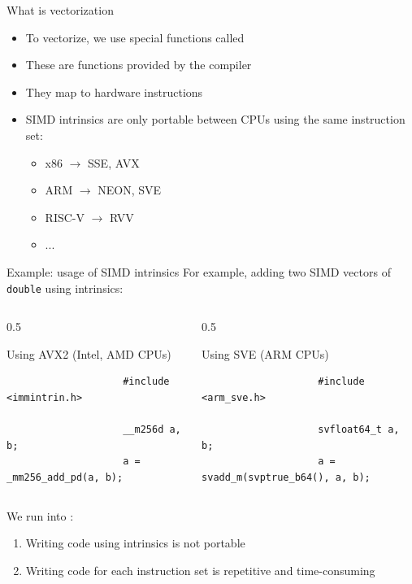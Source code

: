 \documentclass[
    aspectratio=169,
]{beamer}
\renewcommand{\caption}[1]{%
    \begin{center}
        \color{darkgray}
        \scriptsize #1
    \end{center}%
}
\begin{document}
\begin{frame}[fragile]{What is vectorization}
    \begin{itemize}
        \item To vectorize, we use special functions called 
        \item These are functions provided by the compiler
        \item They map to hardware instructions
        \item SIMD intrinsics are only portable between CPUs using the same instruction set:
        \begin{itemize}
            \item x86 $\rightarrow$ SSE, AVX
            \item ARM $\rightarrow$ NEON, SVE
            \item RISC-V $\rightarrow$ RVV
            \item ...
        \end{itemize}
    \end{itemize}
\end{frame}

\begin{frame}[fragile]{Example: usage of SIMD intrinsics}
    For example, adding two SIMD vectors of \texttt{double} using intrinsics:
    \begin{columns}
        \begin{column}{0.5\linewidth}
            \begin{center}
                \caption{Using AVX2 (Intel, AMD CPUs)}
                \begin{verbatim}
                    #include <immintrin.h>

                    __m256d a, b;
                    a = _mm256_add_pd(a, b);
                \end{verbatim}
            \end{center}
        \end{column}
        \begin{column}{0.5\linewidth}
            \begin{center}
                \caption{Using SVE (ARM CPUs)}
                \begin{verbatim}
                    #include <arm_sve.h>

                    svfloat64_t a, b;
                    a = svadd_m(svptrue_b64(), a, b);
                \end{verbatim}
            \end{center}
        \end{column}
    \end{columns}

    \vspace{10pt}

    We run into :
    \begin{enumerate}
        \item Writing code using intrinsics is not portable
        \item Writing code for each instruction set is repetitive and time-consuming
    \end{enumerate}
\end{frame}
\end{document}

